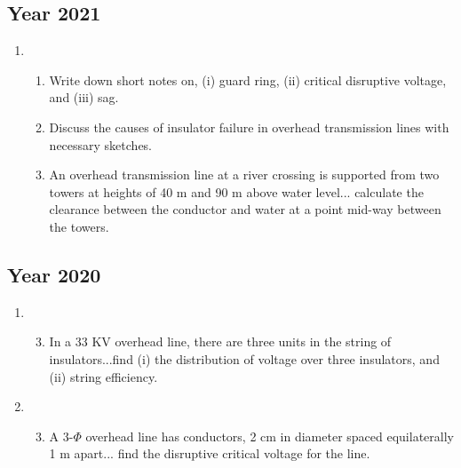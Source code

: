 \documentclass[12pt, a4paper]{article}
\begin{document}
	\subsection{Year 2021}
	\begin{enumerate}[label=\textbf{Q\arabic*.}, wide, labelindent=0pt, start=5]
		\item
		\begin{enumerate}[label=\textbf{(\alph*)}]
			\item Write down short notes on, (i) guard ring, (ii) critical disruptive voltage, and (iii) sag.
			\item Discuss the causes of insulator failure in overhead transmission lines with necessary sketches.
			\item An overhead transmission line at a river crossing is supported from two towers at heights of 40 m and 90 m above water level... calculate the clearance between the conductor and water at a point mid-way between the towers.
		\end{enumerate}
	\end{enumerate}
	
	\subsection{Year 2020}
	\begin{enumerate}[label=\textbf{Q\arabic*.}, wide, labelindent=0pt, start=6]
		\item 
		\begin{enumerate}[label=\textbf{(\alph*)}]
			\setcounter{enumii}{2} %
			\item In a 33 KV overhead line, there are three units in the string of insulators...find (i) the distribution of voltage over three insulators, and (ii) string efficiency.
		\end{enumerate}
		\item
		\begin{enumerate}[label=\textbf{(\alph*)}]
			\setcounter{enumii}{2} %
			\item A 3-$\Phi$ overhead line has conductors, 2 cm in diameter spaced equilaterally 1 m apart... find the disruptive critical voltage for the line.
		\end{enumerate}
	\end{enumerate}
	
\end{document}
